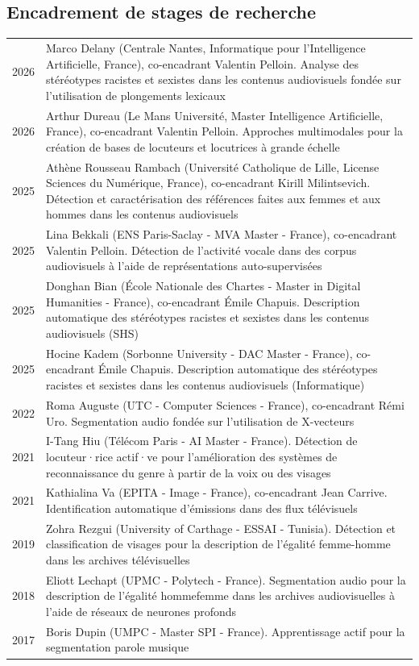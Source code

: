 \begin{fr}
\subsection{Encadrement de stages de recherche}
\begin{xltabular}{\linewidth}{@{}l X@{}}
2026 & Marco Delany (Centrale Nantes, Informatique pour l'Intelligence Artificielle, France), co-encadrant Valentin Pelloin. Analyse des stéréotypes racistes et sexistes dans les contenus audiovisuels fondée sur l’utilisation de plongements lexicaux\\
2026 & Arthur Dureau (Le Mans Université, Master Intelligence Artificielle, France), co-encadrant Valentin Pelloin. Approches multimodales pour la création de bases de locuteurs et locutrices à grande échelle\\
2025 & Athène Rousseau Rambach (Université Catholique de Lille, License Sciences du Numérique, France), co-encadrant Kirill Milintsevich. Détection et caractérisation des références faites aux femmes et aux hommes dans les contenus audiovisuels\\
2025 & Lina Bekkali (ENS Paris-Saclay - MVA Master - France), co-encadrant Valentin Pelloin. Détection de l'activité vocale dans des corpus audiovisuels à l'aide de représentations auto-supervisées\\
2025 & Donghan Bian (\'Ecole Nationale des Chartes - Master in Digital Humanities - France), co-encadrant \'Emile Chapuis. Description automatique des stéréotypes racistes et sexistes dans les contenus audiovisuels (SHS)\\
2025 & Hocine Kadem (Sorbonne University - DAC Master - France), co-encadrant \'Emile Chapuis. Description automatique des stéréotypes racistes et sexistes dans les contenus audiovisuels (Informatique)\\
2022 & Roma Auguste (UTC - Computer Sciences - France), co-encadrant Rémi Uro. Segmentation audio fondée sur l’utilisation de X-vecteurs\\
2021 & I-Tang Hiu (Télécom Paris - AI Master - France). Détection de locuteur·rice actif·ve pour l’amélioration des systèmes de reconnaissance du genre à partir de la voix ou des visages\\
2021 & Kathialina Va (EPITA - Image - France), co-encadrant Jean Carrive. Identification automatique d’émissions dans des flux télévisuels\\
2019 & Zohra Rezgui (University of Carthage - ESSAI - Tunisia). Détection et classification de visages pour la description de l’égalité femme-homme dans les archives télévisuelles\\
2018 & Eliott Lechapt (UPMC - Polytech - France). Segmentation audio pour la description de l’égalité hommefemme dans les archives audiovisuelles à l’aide de réseaux de neurones profonds\\
2017 & Boris Dupin (UMPC - Master SPI - France). Apprentissage actif pour la segmentation parole musique\\
\end{xltabular}
\end{fr}
